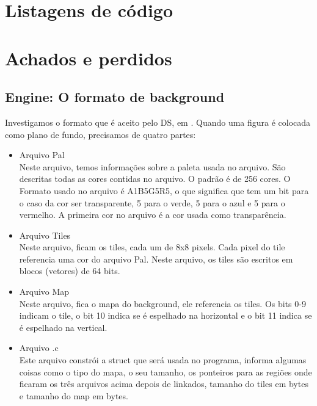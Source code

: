 \documentclass[brazil]{abnt}
\begin{document}
\chapter{Listagens de código}





\chapter{Achados e perdidos}

\section{Engine: O formato de background}

Investigamos o formato que é aceito pelo DS, em \cite{DSSpec}. Quando uma figura é colocada como plano de fundo, precisamos de quatro partes:

\begin{itemize}
 \item Arquivo Pal\\
 Neste arquivo, temos informações sobre a paleta usada no arquivo. São descritas todas as cores contidas no arquivo. O padrão é de 256 cores. O Formato usado no arquivo é A1B5G5R5, o que significa que tem um bit para o caso da cor ser transparente, 5 para o verde, 5 para o azul e 5 para o vermelho. A primeira cor no arquivo é a cor usada como transparência.
 \item Arquivo Tiles\\
 Neste arquivo, ficam os tiles, cada um de 8x8 pixels. Cada pixel do tile referencia uma cor do arquivo Pal. Neste arquivo, os tiles são escritos em blocos (vetores) de 64 bits. 
 \item Arquivo Map\\
 Neste arquivo, fica o mapa do background, ele referencia os tiles. Os bits 0-9 indicam o tile, o bit 10 indica se é espelhado na horizontal e o bit 11 indica se é espelhado na vertical.
 \item Arquivo .c\\
 Este arquivo constrói a struct que será usada no programa, informa algumas coisas como o tipo do mapa, o seu tamanho, os ponteiros para as regiões onde ficaram os três arquivos acima depois de linkados, tamanho do tiles em bytes e tamanho do map em bytes. 
\end{itemize}
\end{document}

